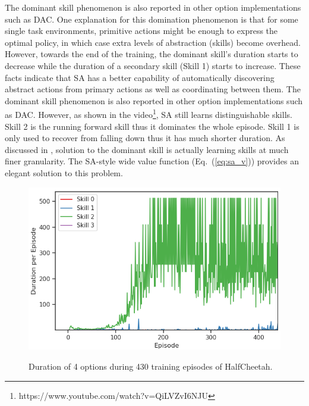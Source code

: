 The dominant skill phenomenon is also reported in other option
implementations such as DAC. One explanation for this domination
phenomenon is that for some single task environments, primitive
actions might be enough to express the optimal policy, in which
case extra levels of abstraction (skills) become overhead.
However, towards the end of the training, the dominant skill's
duration starts to decrease while the duration of a secondary
skill (Skill 1) starts to increase. These facts indicate that SA
has a better capability of automatically discovering abstract
actions from primary actions as well as coordinating between
them. The dominant skill phenomenon is also reported in other
option implementations such as DAC. However, as shown in the
video\footnote{https://www.youtube.com/watch?v=QiLVZvI6NJU}, SA
still learns distinguishable skills. Skill 2 is the running
forward skill thus it dominates the whole episode. Skill 1 is
only used to recover from falling down thus it has much shorter
duration. As discussed in ,
solution to the dominant skill is actually learning skills at
much finer granularity. The SA-style wide value function
(Eq.~(\ref{eq:sa_v})) provides an elegant solution to this
problem.
\begin{figure}[h]
  \centering
  \includegraphics[width=0.7\linewidth]{./Part1/figures/duration.png}\\
  \caption{\label{fig:duration} Duration of 4 options during 430
    training episodes of HalfCheetah.}
\end{figure}

